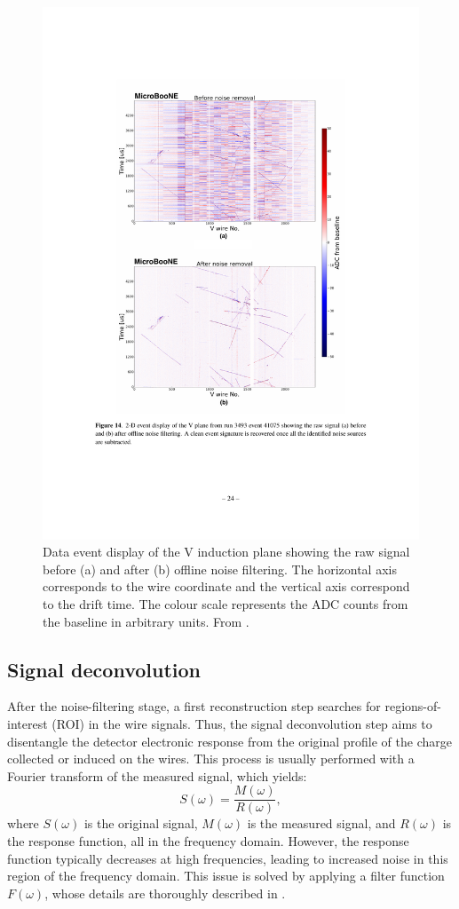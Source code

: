 \begin{figure}[htbp]
    \centering
    \includegraphics[width=0.75\linewidth]{figures/evd_noise.pdf}
    \caption{Data event display of the V induction plane showing the raw signal before (a) and after (b) offline noise filtering. The horizontal axis corresponds to the wire coordinate and the vertical axis correspond to the drift time. The colour scale represents the ADC counts from the baseline in arbitrary units. From \cite{Acciarri:2017sde}.}
    \label{fig:evd_noise}
\end{figure}

\subsection{Signal deconvolution}
After the noise-filtering stage, a first reconstruction step searches for regions-of-interest (ROI) in the wire signals. Thus, the signal deconvolution step aims to disentangle the detector electronic response from the original profile of the charge collected or induced on the wires. This process is usually performed with a Fourier transform of the measured signal, which yields:
\begin{equation}
    S(\omega) = \frac{M(\omega)}{R(\omega)},
\end{equation}
where $S(\omega)$ is the original signal, $M(\omega)$ is the measured signal, and $R(\omega)$ is the response function, all in the frequency domain. However, the response function typically decreases at high frequencies, leading to increased noise in this region of the frequency domain. This issue is solved by applying a filter function $F(\omega)$, whose details are thoroughly described in \cite{Adams:2018dra}. 

